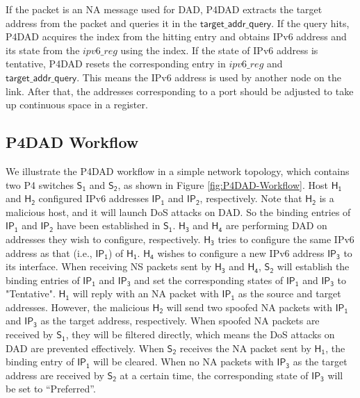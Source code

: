 \documentclass[a4paper,fleqn]{cas-dc}
\begin{document}
        If the packet is an NA message used for DAD, P4DAD extracts the target address from the packet and queries it in the $\mathsf{target\_addr\_query}$. If the query hits, P4DAD acquires the index from the hitting entry and obtains IPv6 address and its state from the $ipv6\_reg$ using the index. If the state of IPv6 address is tentative, P4DAD resets the corresponding entry in $ipv6\_reg$ and $\mathsf{target\_addr\_query}$. This means the IPv6 address is used by another node on the link. After that, the addresses corresponding to a port should be adjusted to take up continuous space in a register.



    \subsection{P4DAD Workflow}
        We illustrate the P4DAD workflow in a simple network topology, which contains two P4 switches $\mathsf{S_1}$ and $\mathsf{S_2}$, as shown in Figure \ref{fig:P4DAD-Workflow}. Host $\mathsf{H_1}$ and $\mathsf{H_2}$ configured IPv6 addresses $\mathsf{IP_1}$ and $\mathsf{IP_2}$, respectively. Note that $\mathsf{H_2}$ is a malicious host, and it will launch DoS attacks on DAD. So the binding entries of $\mathsf{IP_1}$ and $\mathsf{IP_2}$ have been established in $\mathsf{S_1}$.
        $\mathsf{H_3}$ and $\mathsf{H_4}$ are performing DAD on addresses they wish to configure, respectively. $\mathsf{H_3}$ tries to configure the same IPv6 address as that (i.e., $\mathsf{IP_1}$) of $\mathsf{H_1}$. $\mathsf{H_4}$ wishes to configure a new IPv6 address $\mathsf{IP_3}$ to its interface.
        When receiving NS packets sent by $\mathsf{H_3}$ and $\mathsf{H_4}$, $\mathsf{S_2}$ will establish the binding entries of $\mathsf{IP_1}$ and $\mathsf{IP_3}$ and set the corresponding states of $\mathsf{IP_1}$ and $\mathsf{IP_3}$ to "Tentative". $\mathsf{H_1}$ will reply with an NA packet with $\mathsf{IP_1}$ as the source and target addresses. However, the malicious $\mathsf{H_2}$ will send two spoofed NA packets with $\mathsf{IP_1}$ and $\mathsf{IP_3}$ as the target address, respectively. When spoofed NA packets are received by $\mathsf{S_1}$, they will be filtered directly, which means the DoS attacks on DAD are prevented effectively. When $\mathsf{S_2}$ receives the NA packet sent by $\mathsf{H_1}$, the binding entry of $\mathsf{IP_1}$ will be cleared. When no NA packets with $\mathsf{IP_3}$ as the target address are received by $\mathsf{S_2}$ at a certain time, the corresponding state of $\mathsf{IP_3}$ will be set to ``Preferred''.  
\end{document}
